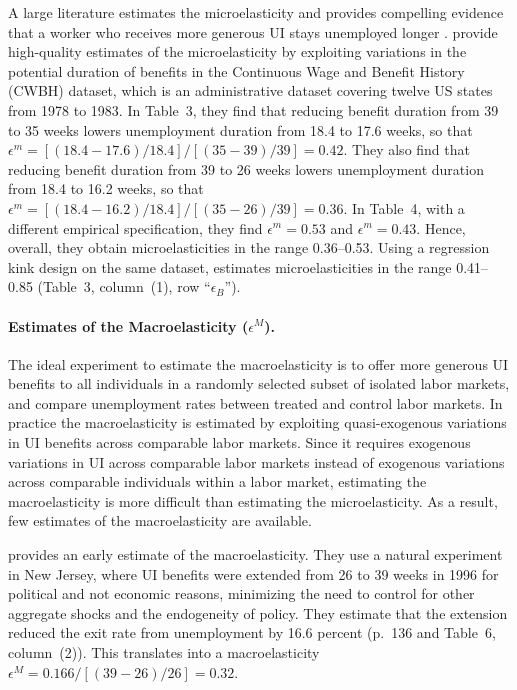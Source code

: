 \documentclass[letterpaper,12pt,leqno]{article}
\newcommand{\brk}[1]{\left[ #1 \right]}
\def \e{{\epsilon}}
\begin{document}
A large literature estimates the microelasticity and provides compelling evidence that a worker who receives more generous UI stays unemployed longer \citep{KM02,CF12}. \citet{KM90} provide high-quality estimates of the microelasticity by exploiting variations in the potential duration of benefits in the Continuous Wage and Benefit History (CWBH) dataset, which is an administrative dataset covering twelve US states from 1978 to 1983. In Table~3, they find that reducing benefit duration from 39 to 35 weeks lowers unemployment duration from 18.4 to 17.6 weeks, so that $\e^m= \brk{(18.4-17.6)/18.4}/\brk{(35-39)/39}=0.42$. They also find that reducing benefit duration from 39 to 26 weeks lowers unemployment duration from 18.4 to 16.2 weeks, so that $\e^m= \brk{(18.4-16.2)/18.4}/\brk{(35-26)/39}=0.36$. In Table~4, with a different empirical specification, they find $\e^m=0.53$ and $\e^m=0.43$. Hence, overall, they obtain microelasticities in the range 0.36--0.53. Using a regression kink design on the same dataset, \citet{L11} estimates microelasticities in the range 0.41--0.85 (Table~3, column~(1), row ``$\e_B$'').

\paragraph{Estimates of the Macroelasticity ($\e^M$).} The ideal experiment to estimate the macroelasticity is to offer more generous UI benefits to all individuals in a randomly selected subset of isolated labor markets, and compare unemployment rates between treated and control labor markets. In practice the macroelasticity is estimated by exploiting quasi-exogenous variations in UI benefits across comparable labor markets. Since it requires exogenous variations in UI across comparable labor markets instead of exogenous variations across comparable individuals within a labor market, estimating the macroelasticity is more difficult than estimating the microelasticity. As a result, few estimates of the macroelasticity are available.

\citet{CarL00} provides an early estimate of the macroelasticity. They use a natural experiment in New Jersey, where UI benefits were extended from 26 to 39 weeks in 1996 for political and not economic reasons, minimizing the need to control for other aggregate shocks and the endogeneity of policy. They estimate that the extension reduced the exit rate from unemployment by 16.6 percent (p.~136 and Table~6, column~(2)). This translates into a macroelasticity $\e^M= 0.166/\brk{(39-26)/26} = 0.32$.
\end{document}
